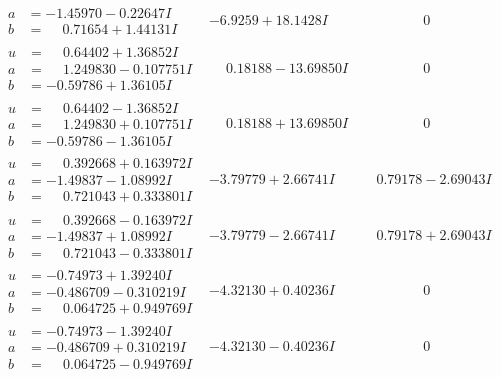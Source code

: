 \documentclass[1p]{elsarticle_modified}
\theoremstyle{definition}
\begin{document}
$$\begin{array}{c|c|c}
\begin{aligned}
a &= -1.45970 - 0.22647 I \\
b &= \phantom{-}0.71654 + 1.44131 I\end{aligned}
 & -6.9259 + 18.1428 I & \phantom{-0.000000 } 0 \\ \hline\begin{aligned}
u &= \phantom{-}0.64402 + 1.36852 I \\
a &= \phantom{-}1.249830 - 0.107751 I \\
b &= -0.59786 + 1.36105 I\end{aligned}
 & \phantom{-}0.18188 - 13.69850 I & \phantom{-0.000000 } 0 \\ \hline\begin{aligned}
u &= \phantom{-}0.64402 - 1.36852 I \\
a &= \phantom{-}1.249830 + 0.107751 I \\
b &= -0.59786 - 1.36105 I\end{aligned}
 & \phantom{-}0.18188 + 13.69850 I & \phantom{-0.000000 } 0 \\ \hline\begin{aligned}
u &= \phantom{-}0.392668 + 0.163972 I \\
a &= -1.49837 - 1.08992 I \\
b &= \phantom{-}0.721043 + 0.333801 I\end{aligned}
 & -3.79779 + 2.66741 I & \phantom{-}0.79178 - 2.69043 I \\ \hline\begin{aligned}
u &= \phantom{-}0.392668 - 0.163972 I \\
a &= -1.49837 + 1.08992 I \\
b &= \phantom{-}0.721043 - 0.333801 I\end{aligned}
 & -3.79779 - 2.66741 I & \phantom{-}0.79178 + 2.69043 I \\ \hline\begin{aligned}
u &= -0.74973 + 1.39240 I \\
a &= -0.486709 - 0.310219 I \\
b &= \phantom{-}0.064725 + 0.949769 I\end{aligned}
 & -4.32130 + 0.40236 I & \phantom{-0.000000 } 0 \\ \hline\begin{aligned}
u &= -0.74973 - 1.39240 I \\
a &= -0.486709 + 0.310219 I \\
b &= \phantom{-}0.064725 - 0.949769 I\end{aligned}
 & -4.32130 - 0.40236 I & \phantom{-0.000000 } 0 \\ \hline\begin{aligned}

\end{aligned}
\end{array}$$
\end{document}
